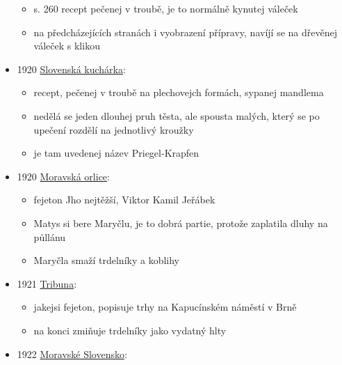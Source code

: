 \begin{itemize}
  \begin{itemize}
  \tightlist
  \item
    s. 260 recept pečenej v troubě, je to normálně kynutej váleček
  \item
    na předcházejících stranách i vyobrazení přípravy, navíjí se na
    dřevěnej váleček s klikou
  \end{itemize}
\item
  1920
  \href{https://dikda.snk.sk/uuid/uuid:a65dbdb4-70d4-436e-92af-86192f998fc5}{Slovenská
  kuchárka}:

  \begin{itemize}
  \tightlist
  \item
    recept, pečenej v troubě na plechovejch formách, sypanej mandlema
  \item
    nedělá se jeden dlouhej pruh těsta, ale spousta malých, který se po
    upečení rozdělí na jednotlivý kroužky
  \item
    je tam uvedenej název Priegel-Krapfen
  \end{itemize}
\item
  1920
  \href{https://ceskadigitalniknihovna.cz/view/uuid:7a29ece0-be2c-11de-a09c-000d606f5dc6?page=uuid:461eb510-b739-11de-8d2b-000d606f5dc6&fulltext=trdeln\%C3\%AD*&source=mzk}{Moravská
  orlice}:

  \begin{itemize}
  \tightlist
  \item
    fejeton Jho nejtěžší, Viktor Kamil Jeřábek
  \item
    Matys si bere Maryčlu, je to dobrá partie, protože zaplatila dluhy
    na půllánu
  \item
    Maryčla smaží trdelníky a koblihy
  \end{itemize}
\item
  1921
  \href{https://ceskadigitalniknihovna.cz/uuid/uuid:e28419ef-cadc-449a-834c-164adadcc55b}{Tribuna}:

  \begin{itemize}
  \tightlist
  \item
    jakejsi fejeton, popisuje trhy na Kapucínském náměstí v Brně
  \item
    na konci zmiňuje trdelníky jako vydatný hlty
  \end{itemize}
\item
  1922
  \href{https://ndk.cz/view/uuid:d875fc80-2c59-11e4-8f64-005056827e52?page=uuid\%3A4ba3cc00-5b4e-11e4-a6f0-5ef3fc9ae867&fulltext=trdeln\%C3\%ADky}{Moravské
  Slovensko}:


\end{itemize}
